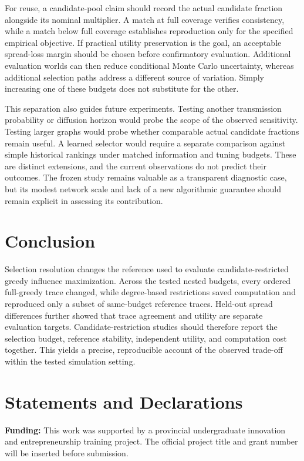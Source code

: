 \documentclass[smallextended]{svjour3}
\begin{document}
For reuse, a candidate-pool claim should record the actual candidate fraction alongside its nominal multiplier. A match at full coverage verifies consistency, while a match below full coverage establishes reproduction only for the specified empirical objective. If practical utility preservation is the goal, an acceptable spread-loss margin should be chosen before confirmatory evaluation. Additional evaluation worlds can then reduce conditional Monte Carlo uncertainty, whereas additional selection paths address a different source of variation. Simply increasing one of these budgets does not substitute for the other.

This separation also guides future experiments. Testing another transmission probability or diffusion horizon would probe the scope of the observed sensitivity. Testing larger graphs would probe whether comparable actual candidate fractions remain useful. A learned selector would require a separate comparison against simple historical rankings under matched information and tuning budgets. These are distinct extensions, and the current observations do not predict their outcomes. The frozen study remains valuable as a transparent diagnostic case, but its modest network scale and lack of a new algorithmic guarantee should remain explicit in assessing its contribution.


\section{Conclusion}

Selection resolution changes the reference used to evaluate candidate-restricted greedy influence maximization. Across the tested nested budgets, every ordered full-greedy trace changed, while degree-based restrictions saved computation and reproduced only a subset of same-budget reference traces. Held-out spread differences further showed that trace agreement and utility are separate evaluation targets. Candidate-restriction studies should therefore report the selection budget, reference stability, independent utility, and computation cost together. This yields a precise, reproducible account of the observed trade-off within the tested simulation setting.


\section*{Statements and Declarations}

\textbf{Funding:} This work was supported by a provincial undergraduate innovation and entrepreneurship training project. The official project title and grant number will be inserted before submission.
\end{document}
